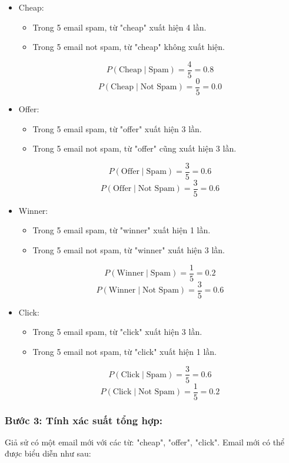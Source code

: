 \begin{itemize}
    \item Cheap:
    \begin{itemize}
        \item Trong 5 email spam, từ "cheap" xuất hiện 4 lần.
        \item Trong 5 email not spam, từ "cheap" không xuất hiện.
    \end{itemize}
    \[P(\text{Cheap} \mid \text{Spam}) = \frac{4}{5} = 0.8\]
    \[P(\text{Cheap} \mid \text{Not Spam}) = \frac{0}{5} = 0.0 \]
 
    \item Offer:
    \begin{itemize}
        \item Trong 5 email spam, từ "offer" xuất hiện 3 lần.
        \item Trong 5 email not spam, từ "offer" cũng xuất hiện 3 lần.
    \end{itemize}
    \[ P(\text{Offer} \mid \text{Spam}) = \frac{3}{5} = 0.6 \]
    \[P(\text{Offer} \mid \text{Not Spam}) = \frac{3}{5} = 0.6\]
    
    \item Winner:
    \begin{itemize}
        \item Trong 5 email spam, từ "winner" xuất hiện 1 lần.
        \item Trong 5 email not spam, từ "winner" xuất hiện 3 lần.
    \end{itemize}
    \[P(\text{Winner} \mid \text{Spam}) = \frac{1}{5} = 0.2\]
    \[P(\text{Winner} \mid \text{Not Spam}) = \frac{3}{5} = 0.6 \]
    
    \item Click:
    \begin{itemize}
        \item Trong 5 email spam, từ "click" xuất hiện 3 lần.
        \item Trong 5 email not spam, từ "click" xuất hiện 1 lần.
    \end{itemize}
    \[P(\text{Click} \mid \text{Spam}) = \frac{3}{5} = 0.6\]
    \[P(\text{Click} \mid \text{Not Spam}) = \frac{1}{5} = 0.2\]
    \end{itemize}

\subsubsection{Bước 3: Tính xác suất tổng hợp:}

Giả sử có một email mới với các từ: "cheap", "offer", "click". Email mới có thể được biểu diễn như sau:

